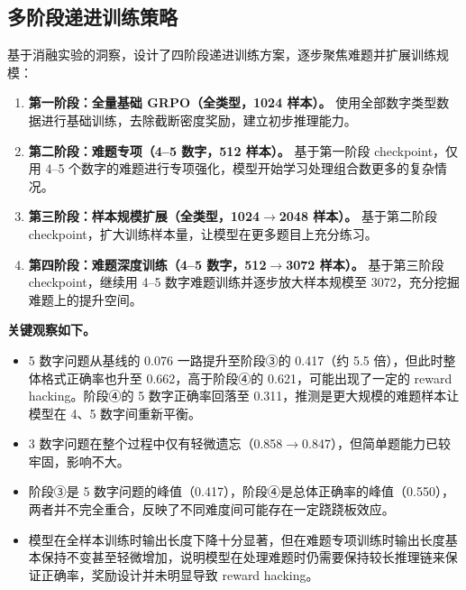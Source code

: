 \documentclass[UTF8,a4paper,10pt,twocolumn]{ctexart}
\begin{document}
\subsection{多阶段递进训练策略}

基于消融实验的洞察，设计了四阶段递进训练方案，逐步聚焦难题并扩展训练规模：
\begin{enumerate}
  \item \textbf{第一阶段：全量基础 GRPO（全类型，1024 样本）。} 使用全部数字类型数据进行基础训练，去除截断密度奖励，建立初步推理能力。
  \item \textbf{第二阶段：难题专项（4--5 数字，512 样本）。} 基于第一阶段 checkpoint，仅用 4--5 个数字的难题进行专项强化，模型开始学习处理组合数更多的复杂情况。
  \item \textbf{第三阶段：样本规模扩展（全类型，1024$\rightarrow$2048 样本）。} 基于第二阶段 checkpoint，扩大训练样本量，让模型在更多题目上充分练习。
  \item \textbf{第四阶段：难题深度训练（4--5 数字，512$\rightarrow$3072 样本）。} 基于第三阶段 checkpoint，继续用 4--5 数字难题训练并逐步放大样本规模至 3072，充分挖掘难题上的提升空间。
\end{enumerate}

\begin{table}[t]
  \centering
  \caption{多阶段递进训练结果}
\end{table}

\textbf{关键观察如下。}
\begin{itemize}
  \item 5 数字问题从基线的 0.076 一路提升至阶段③的 0.417（约 5.5 倍），但此时整体格式正确率也升至 0.662，高于阶段④的 0.621，可能出现了一定的 reward hacking。阶段④的 5 数字正确率回落至 0.311，推测是更大规模的难题样本让模型在 4、5 数字间重新平衡。
  \item 3 数字问题在整个过程中仅有轻微遗忘（0.858$\rightarrow$0.847），但简单题能力已较牢固，影响不大。
  \item 阶段③是 5 数字问题的峰值（0.417），阶段④是总体正确率的峰值（0.550），两者并不完全重合，反映了不同难度间可能存在一定跷跷板效应。
  \item 模型在全样本训练时输出长度下降十分显著，但在难题专项训练时输出长度基本保持不变甚至轻微增加，说明模型在处理难题时仍需要保持较长推理链来保证正确率，奖励设计并未明显导致 reward hacking。
\end{itemize}
\end{document}
